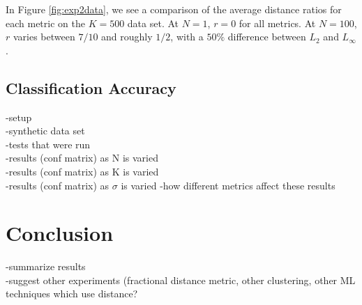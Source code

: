 \documentclass{article}
\begin{document}
In Figure \ref{fig:exp2data}, we see a comparison of the average distance ratios for each metric on the $K=500$ data set. At $N=1$, $r=0$ for all metrics. At $N=100$, $r$ varies between $7/10$ and roughly $1/2$, with a $50\%$ difference between $L_2$ and $L_{\infty}$.

\subsection{Classification Accuracy}
-setup\\
-synthetic data set\\
-tests that were run\\
-results (conf matrix) as N is varied\\
-results (conf matrix) as K is varied\\
-results (conf matrix) as $\sigma$ is varied
-how different metrics affect these results
\section{Conclusion}
-summarize results\\
-suggest other experiments (fractional distance metric, other clustering, other ML techniques which use distance?
	


\end{document}
